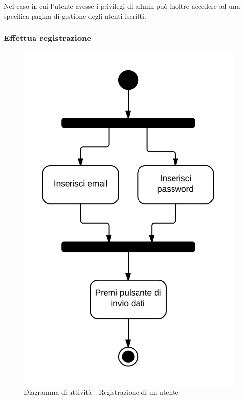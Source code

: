 Nel caso in cui l'utente avesse i privilegi di admin può inoltre accedere ad una specifica pagina di gestione degli utenti iscritti.

\subsubsection{Effettua registrazione}

\begin{figure}[H]
\centering
\includegraphics[scale=0.1]{uml/attivita/MaaP - Effettua registrazione.png}
\caption{Diagramma di attività - Registrazione di un utente}
\end{figure}

